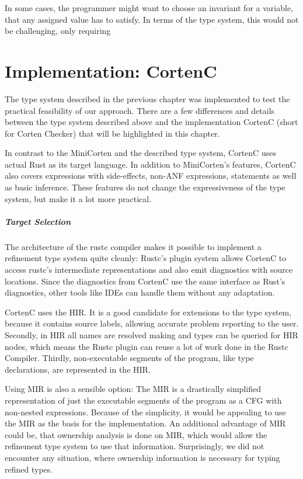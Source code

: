 \documentclass[twoside, english]{sdqthesis}
\theoremstyle{definition}
\begin{document}
In some cases, the programmer might want to choose an invariant for a variable, that any assigned value has to satisfy. In terms of the type system, this would not be challenging, only requiring 

\chapter{Implementation: CortenC} \label{ch:implementation}

The type system described in the previous chapter was implemented to test the practical feasibility of our approach.
There are a few differences and details between the type system described above and the implementation CortenC (short for Corten Checker) that will be highlighted in this chapter.

In contrast to the MiniCorten and the described type system, CortenC uses actual Rust as its target language. In addition to MiniCorten's features, CortenC also covers expressions with side-effects, non-ANF expressions, statements as well as basic inference.
These features do not change the expressiveness of the type system, but make it a lot more practical.

\paragraph{Target Selection}
The architecture of the rustc compiler makes it possible to implement a refinement type system quite cleanly: Rustc's plugin system allows CortenC to access rustc's intermediate representations and also emit diagnostics with source locations. Since the diagnostics from CortenC use the same interface as Rust's diagnostics, other tools like IDEs can handle them without any adaptation.

CortenC uses the HIR. It is a good candidate for extensions to the type system, because it contains source labels, allowing accurate problem reporting to the user. Secondly, in HIR all names are resolved making and types can be queried for HIR nodes, which means the Rustc plugin can reuse a lot of work done in the Rustc Compiler. Thirdly, non-executable segments of the program, like type declarations, are represented in the HIR.

Using MIR is also a sensible option: The MIR is a drastically simplified representation of just the executable segments of the program as a CFG with non-nested expressions. Because of the simplicity, it would be appealing to use the MIR as the basis for the implementation. 
An additional advantage of MIR could be, that ownership analysis is done on MIR, which would allow the refinement type system to use that information. Surprisingly, we did not encounter any situation, where ownership information is necessary for typing refined types.
\end{document}
